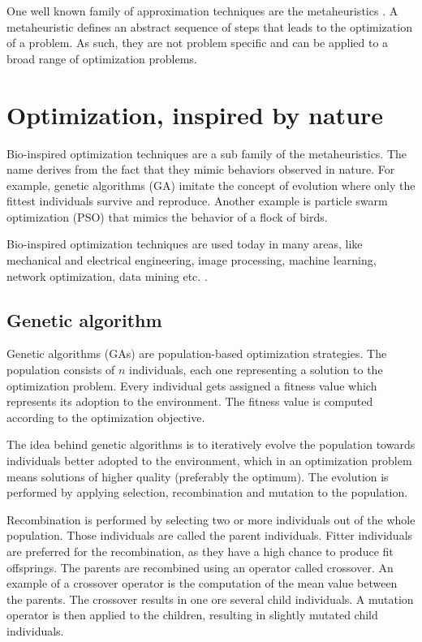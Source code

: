 One well known family of approximation techniques are the metaheuristics \cite{yang2010nature}. A metaheuristic defines an abstract sequence of steps that leads to the optimization of a problem. As such, they are not problem specific and can be applied to a broad range of optimization problems.

\section{Optimization, inspired by nature}
Bio-inspired optimization techniques are a sub family of the metaheuristics. The name derives from the fact that they mimic behaviors observed in nature. For example, genetic algorithms (GA) \cite{sivanandam2008genetic} imitate the concept of evolution where only the fittest individuals survive and reproduce. Another example is particle swarm optimization (PSO) \cite{kennedy2010particle} that mimics the behavior of a flock of birds.

Bio-inspired optimization techniques are used today in many areas, like mechanical and electrical engineering, image processing, machine learning, network optimization, data mining etc. \cite{sivanandam2008genetic}.

\subsection{Genetic algorithm}
\label{chap:bioalgorithms:ga}
Genetic algorithms (GAs) are population-based optimization strategies. The population consists of $n$ individuals, each one representing a solution to the optimization problem. Every individual gets assigned a fitness value which represents its adoption to the environment. The fitness value is computed according to the optimization objective.

The idea behind genetic algorithms is to iteratively evolve the population towards individuals better adopted to the environment, which in an optimization problem means solutions of higher quality (preferably the optimum). The evolution is performed by applying selection, recombination and mutation to the population.

Recombination is performed by selecting two or more individuals out of the whole population. Those individuals are called the parent individuals. Fitter individuals are preferred for the recombination, as they have a high chance to produce fit offsprings. The parents are recombined using an operator called crossover. An example of a crossover operator is the computation of the mean value between the parents. The crossover results in one ore several child individuals. A mutation operator is then applied to the children, resulting in slightly mutated child individuals.

